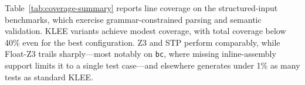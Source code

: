 \documentclass[acmsmall,screen,nonacm]{acmart}
\newcommand{\projName}{\textsc{Gordian}\xspace}
\theoremstyle{definition}
\begin{document}



Table~\ref{tab:coverage-summary} reports line coverage on the structured-input benchmarks, which exercise grammar-constrained parsing and semantic validation. KLEE variants achieve modest coverage, with total coverage below 40\% even for the best configuration. Z3 and STP perform comparably, while Float-Z3 trails sharply---most notably on \texttt{bc}, where missing inline-assembly support limits it to a single test case---and elsewhere generates under 1\% as many tests as standard KLEE.
\end{document}
